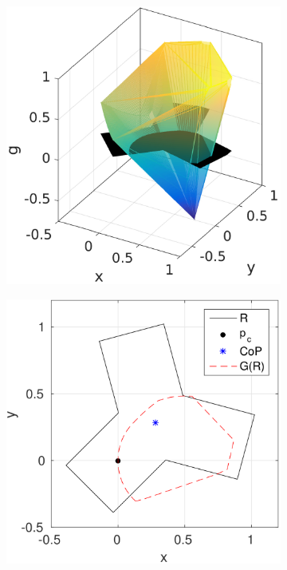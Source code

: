 \documentclass[conference]{IEEEtran}
\begin{document}
\begin{figure}[t]
\begin{subfigure}[b]{0.24\textwidth}
    \caption{}
  \end{subfigure}
  \begin{subfigure}[b]{0.24\textwidth}
    \centering
    \includegraphics[width=1\linewidth]{fig/moment_hull_3}
    \caption{}
  \end{subfigure}
  \begin{subfigure}[b]{0.24\textwidth}
    \centering
    \includegraphics[width=1\linewidth]{fig/CoP_boundary}

\end{subfigure}
\end{figure}
\end{document}
